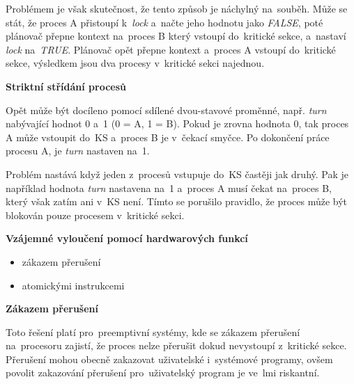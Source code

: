 \vspace{0,5cm}

Problémem je však skutečnost, že tento způsob je náchylný na~souběh. Může se stát, že proces A přistoupí k~\emph{lock} a~načte jeho hodnotu jako \emph{FALSE}, poté plánovač přepne kontext na~proces B který vstoupí do~kritické sekce, a~nastaví \emph{lock} na~\emph{TRUE}.  Plánovač opět přepne kontext a~proces A vstoupí do~kritické sekce, výsledkem jsou dva procesy v~kritické sekci najednou. 

\begin{large}
    \vspace{0,5cm}
    \textbf{Striktní střídání procesů}
\end{large}

Opět může být docíleno pomocí sdílené dvou-stavové proměnné, např. \emph{turn} nabývající hodnot 0 a~1 (0 = A, 1 = B). Pokud je zrovna hodnota 0, tak proces A může vstoupit do~KS a~proces B je v~čekací smyčce. Po dokončení práce procesu A, je \emph{turn} nastaven na~1.

\vspace{0,5cm}

Problém nastává když jeden z~procesů vstupuje do~KS častěji jak druhý. Pak je například hodnota \emph{turn} nastavena na~1 a~proces A musí čekat na~proces B, který však zatím ani v~KS není. Tímto se porušilo pravidlo, že proces může být blokován pouze procesem v~kritické sekci. 

\begin{large}
    \vspace{0,5cm}
    \textbf{Vzájemné vyloučení pomocí hardwarových funkcí}    
\end{large}

\begin{itemize}
    \item zákazem přerušení
    \item atomickými instrukcemi
\end{itemize}

\begin{large}
    \vspace{0,5cm}
    \textbf{Zákazem přerušení}    
\end{large}

Toto řešení platí pro~preemptivní systémy, kde se zákazem přerušení na~procesoru zajistí, že proces nelze přerušit dokud nevystoupí z~kritické sekce. Přerušení mohou obecně zakazovat uživatelské i~systémové programy, ovšem povolit zakazování přerušení pro~uživatelský program je ve~lmi riskantní. 

